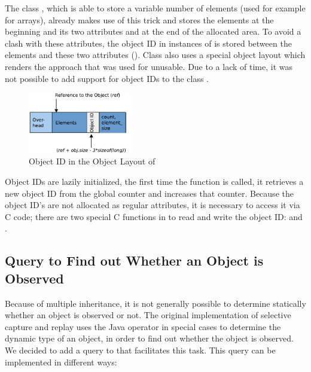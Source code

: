 The class , which is able to store a variable number of elements (used for example for arrays), already makes use of this trick and stores the elements at the beginning and its two attributes  and  at the end of the allocated area. To avoid a clash with these attributes, the object ID in instances of  is stored between the elements and these two attributes (). Class  also uses a special object layout which renders the approach that was used for  unusable. Due to a lack of time, it was not possible to add support for object IDs to the class .
\begin{figure}[ht]
  \centering
  \includegraphics[width=0.4\textwidth]{illustrations/special_object_id}
  \caption{Object ID in the Object Layout of }
  \label{fig:special_object_id}
\end{figure}

Object IDs are lazily initialized, the first time the function  is called, it retrieves a new object ID from the global counter  and increases that counter. Because the object ID's are not allocated as regular attributes, it is necessary to access it via C code; there are two special C functions in  to read and write the object ID:  and .


\subsection{Query to Find out Whether an Object is Observed}
\label{lbl:is_observed}
Because of multiple inheritance, it is not generally possible to determine statically whether an object is observed or not. The original implementation of selective capture and replay uses the Java operator  in special cases to determine the dynamic type of an object, in order to find out whether the object is observed. We decided to add a query to  that facilitates this task. This query can be implemented in different ways: 

